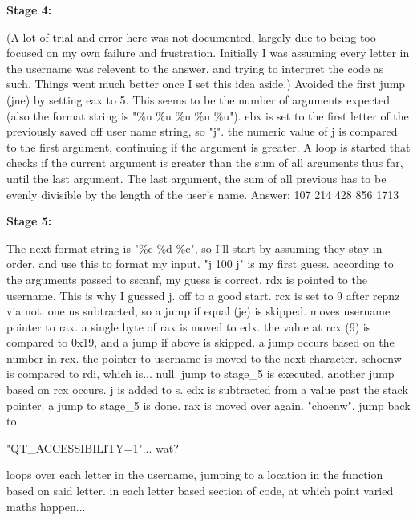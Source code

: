 \documentclass{article}
\begin{document}
    \bigskip

    \textbf{Stage 4:}

    \bigskip

    (A lot of trial and error here was not documented, largely due to being too focused on my own failure and frustration. Initially I was assuming every letter in the username was relevent to the answer, and trying to interpret the code as such. Things went much better once I set this idea aside.)
    Avoided the first jump (jne) by setting eax to 5. This seems to be the number of arguments expected (also the format string is "\%u \%u \%u \%u \%u"). ebx is set to the first letter of the previously saved off user name string, so "j". the numeric value of j is compared to the first argument, continuing if the argument is greater. A loop is started that checks if the current argument is greater than the sum of all arguments thus far, until the last argument.
    The last argument, the sum of all previous\+ has to be evenly divisible by the length of the user's name.
    Answer: 107 214 428 856 1713

    \bigskip

    \textbf{Stage 5:}

    \bigskip

    The next format string is "\%c \%d \%c", so I'll start by assuming they stay in order, and use this to format my input.
    "j 100 j" is my first guess.
    according to the arguments passed to sscanf, my guess is correct.
    rdx is pointed to the username. This is why I guessed j. off to a good start.
    rcx is set to 9 after repnz via not.
    one us subtracted, so a jump if equal (je) is skipped.
    moves username pointer to rax.
    a single byte of rax is moved to edx.
    the value at rcx (9) is compared to 0x19, and a jump if above is skipped.
    a jump occurs based on the number in rcx.
    the pointer to username is moved to the next character.
    schoenw is compared to rdi, which is... null.
    jump to stage\_5 is executed.
    another jump based on rcx occurs.
    j is added to s.
    edx is subtracted from a value past the stack pointer.
    a jump to stage\_5 is done.
    rax is moved over again. "choenw".
    jump back to 
    
    "QT\_ACCESSIBILITY=1"... wat?
    
    loops over each letter in the username, jumping to a location in the function based on said letter. in each letter based section of code, at which point varied maths happen...
    
\end{document}
